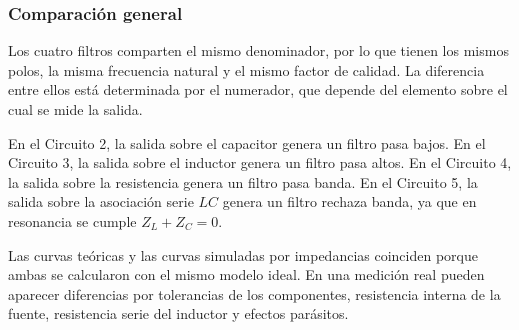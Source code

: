 \subsubsection{Comparación general}

\begin{table}[H]
\centering
\caption{$H_i(s),\ z_i,\ f_i$}
\label{tab:resumen_general_filtros}
\end{table}

Los cuatro filtros comparten el mismo denominador, por lo que tienen los mismos polos, la misma frecuencia natural y el mismo factor de calidad. La diferencia entre ellos está determinada por el numerador, que depende del elemento sobre el cual se mide la salida.

En el Circuito 2, la salida sobre el capacitor genera un filtro pasa bajos. En el Circuito 3, la salida sobre el inductor genera un filtro pasa altos. En el Circuito 4, la salida sobre la resistencia genera un filtro pasa banda. En el Circuito 5, la salida sobre la asociación serie $LC$ genera un filtro rechaza banda, ya que en resonancia se cumple $Z_L+Z_C=0$.

Las curvas teóricas y las curvas simuladas por impedancias coinciden porque ambas se calcularon con el mismo modelo ideal. En una medición real pueden aparecer diferencias por tolerancias de los componentes, resistencia interna de la fuente, resistencia serie del inductor y efectos parásitos.